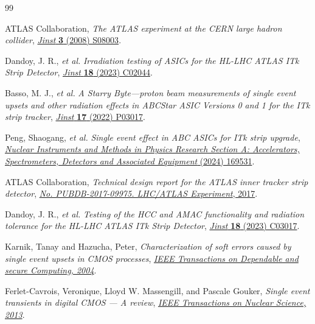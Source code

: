 \documentclass[a4paper,11pt]{article}
\begin{document}
\begin{thebibliography}{99}


ATLAS Collaboration,
\emph{The ATLAS experiment at the CERN large hadron collider},
\href{http://iopscience.iop.org/1748-0221/3/08/S08003}{\emph{Jinst} {\bf 3} (2008) S08003}.

Dandoy, J. R., \textit{et al.}
\emph{Irradiation testing of ASICs for the HL-LHC ATLAS ITk Strip Detector},
\href{https://iopscience.iop.org/article/10.1088/1748-0221/18/02/C02044}{\emph{Jinst} {\bf 18} (2023) C02044}.

Basso, M. J., \textit{et al.}
\emph{A Starry Byte—proton beam measurements of single event upsets and other radiation effects in ABCStar ASIC Versions 0 and 1 for the ITk strip tracker},
\href{https://iopscience.iop.org/article/10.1088/1748-0221/17/03/P03017}{\emph{Jinst} {\bf 17} (2022) P03017}.

Peng, Shaogang, \textit{et al.}
\emph{Single event effect in ABC ASICs for ITk strip upgrade},
\href{https://www.sciencedirect.com/science/article/pii/S0168900224004571}{\emph{Nuclear Instruments and Methods in Physics Research Section A: Accelerators, Spectrometers, Detectors and Associated Equipment} (2024) 169531}.

ATLAS Collaboration,
\emph{Technical design report for the ATLAS inner tracker strip detector},
\href{https://bib-pubdb1.desy.de/record/390920}{\emph{No. PUBDB-2017-09975. LHC/ATLAS Experiment}, 2017}.

Dandoy, J. R., \textit{et al.}
\emph{Testing of the HCC and AMAC functionality and radiation tolerance for the HL-LHC ATLAS ITk Strip Detector},
\href{https://iopscience.iop.org/article/10.1088/1748-0221/18/03/C03017}{\emph{Jinst} {\bf 18} (2023) C03017}.


Karnik, Tanay and Hazucha, Peter, 
\emph{Characterization of soft errors caused by single event upsets in CMOS processes},
\href{https://ieeexplore.ieee.org/abstract/document/1350778}{\emph{IEEE Transactions on Dependable and secure Computing, 2004}}.

Ferlet-Cavrois, Veronique, Lloyd W. Massengill, and Pascale Gouker, 
\emph{Single event transients in digital CMOS — A review},
\href{https://ieeexplore.ieee.org/abstract/document/6530775}{\emph{IEEE Transactions on Nuclear Science, 2013}}.


\end{thebibliography}
\end{document}
